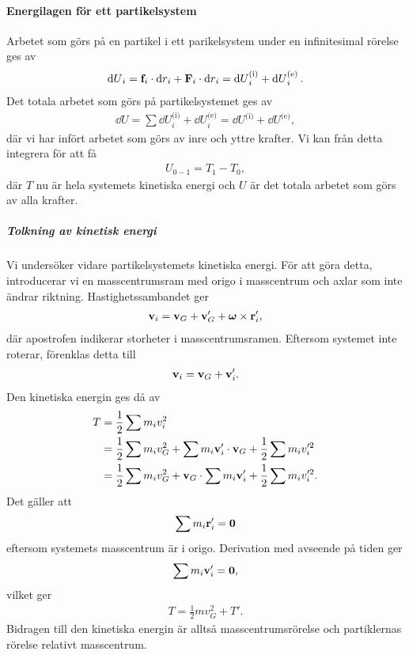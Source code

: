 \paragraph{Energilagen för ett partikelsystem}
Arbetet som görs på en partikel i ett parikelsystem under en infinitesimal rörelse ges av
\begin{align*}
	\dd{U}_{i} = \vb{f}_{i}\cdot\dd{r}_i + \vb{F}_{i}\cdot\dd{r}_i = \dd{U}_{i}^{\text{(i)}} + \dd{U}_{i}^{\text{(e)}}.
\end{align*}
Det totala arbetet som görs på partikelsystemet ges av
\begin{align*}
	\dd{U} = \sum \dd{U}_{i}^{\text{(i)}} + \dd{U}_{i}^{\text{(e)}} = \dd{U}^{\text{(i)}} + \dd{U}^{\text{(e)}},
\end{align*}
där vi har infört arbetet som görs av inre och yttre krafter. Vi kan från detta integrera för att få
\begin{align*}
	U_{0 - 1} = T_{1} - T_{0},
\end{align*}
där $T$ nu är hela systemets kinetiska energi och $U$ är det totala arbetet som görs av alla krafter.

\subparagraph{Tolkning av kinetisk energi}
Vi undersöker vidare partikelsystemets kinetiska energi. För att göra detta, introducerar vi en masscentrumsram med origo i masscentrum och axlar som inte ändrar riktning. Hastighetssambandet ger
\begin{align*}
	\vb{v}_{i} = \vb{v}_{G} + \vb{v}_{G}' + \vb*{\omega}\times\vb{r}_{i}',
\end{align*}
där apostrofen indikerar storheter i masscentrumsramen. Eftersom systemet inte roterar, förenklas detta till
\begin{align*}
	\vb{v}_{i} = \vb{v}_{G} + \vb{v}_{i}'.
\end{align*}
Den kinetiska energin ges då av
\begin{align*}
	T &= \frac{1}{2}\sum m_{i}v_{i}^2 \\
	  &= \frac{1}{2}\sum m_{i}v_{G}^2 + \sum m_{i}\vb{v}_{i}'\cdot\vb{v}_{G} + \frac{1}{2}\sum m_{i}v_{i}'^2 \\
	  &= \frac{1}{2}\sum m_{i}v_{G}^2 + \vb{v}_{G}\cdot\sum m_{i}\vb{v}_{i}' + \frac{1}{2}\sum m_{i}v_{i}'^2.
\end{align*}
Det gäller att
\begin{align*}
	\sum m_{i}\vb{r}_{i}' = \vb{0}
\end{align*}
eftersom systemets masscentrum är i origo. Derivation med avseende på tiden ger
\begin{align*}
	\sum m_{i}\vb{v}_{i}' = \vb{0},
\end{align*}
vilket ger
\begin{align*}
	T = \frac{1}{2}mv_{G}^2 + T'.
\end{align*}
Bidragen till den kinetiska energin är alltså masscentrumsrörelse och partiklernas rörelse relativt masscentrum.

